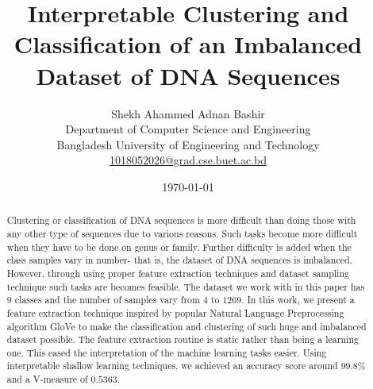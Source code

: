 \documentclass[oneside, twocolumn, a4paper, 10pt]{IEEEtran}
\begin{document}
\title{Interpretable Clustering and Classification of an Imbalanced Dataset of DNA Sequences}
\author{Shekh Ahammed Adnan Bashir \\ Department of Computer Science and Engineering \\ Bangladesh University of Engineering and Technology \\ \url{1018052026@grad.cse.buet.ac.bd}}
\date{\today}
\maketitle

\begin{abstract}
Clustering or classification of DNA sequences is more difficult than doing those with any other type of sequences due to various reasons. Such tasks become more difficult when they have to be done on genus or family. Further difficulty is added when the class samples vary in number- that is, the dataset of DNA sequences is imbalanced. However, through using proper feature extraction techniques and dataset sampling technique such tasks are becomes feasible. The dataset we work with in this paper has $9$ classes and the number of samples vary from $4$ to $1269$. In this work, we present a feature extraction technique inspired by popular Natural Language Preprocessing algorithm GloVe \cite{1} to make the classification and clustering of such huge and imbalanced dataset possible. The feature extraction routine is static rather than being a learning one. This eased the interpretation of the machine learning tasks easier. Using interpretable shallow learning techniques, we achieved an accuracy score around $99.8$\% and a V-measure of $0.5363$.
\end{abstract}
\end{document}
